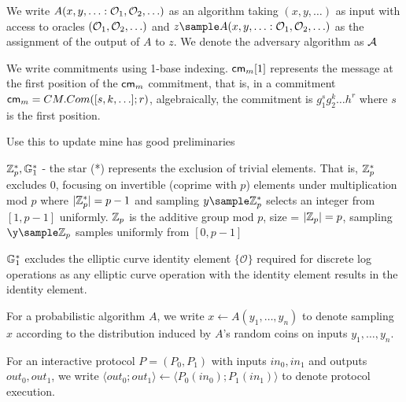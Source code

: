 We write $A(x,y,\ldots : \mathcal{O}_1, \mathcal{O}_2, \ldots)$ as an algorithm taking $(x,y,\ldots)$ as input with access to oracles $(\mathcal{O}_1, \mathcal{O}_2, \ldots)$ and $z \sample A(x,y,\ldots : \oracle_1, \oracle_2, \ldots)$ as the assignment of the output of $A$ to $z$. We denote the adversary algorithm as $\mathcal{A}$

We write commitments using 1-base indexing. $\mathsf{cm}_m[1]$ represents the message at the first position of the $\mathsf{cm}_m$ commitment, that is, in a commitment $\mathsf{cm}_m = CM.Com([s,k,\ldots];r)$, algebraically, the commitment is $g_1^sg_2^k\ldots h^r$ where $s$ is the first position.


Use this to update mine
\cite{hutchison_get_2010} has good preliminaries

$\mathbb{Z}_p^*, \mathbb{G}_1^*$ - the star (*) represents the exclusion of trivial elements. That is, $\mathbb{Z}_p^*$ excludes 0, focusing on invertible (coprime with $p$) elements under multiplication mod $p$ where $|\mathbb{Z}_p^*| = p-1$ and sampling $y \sample \Z_p^*$ selects an integer from $[1, p-1]$ uniformly. $\mathbb{Z}_p$ is the additive group mod $p$, size = $|\mathbb{Z}_p| = p$, sampling $\y \sample \Z_p$ samples uniformly from $[0, p-1]$

$\mathbb{G}_1^*$ excludes the elliptic curve identity element $\{\mathcal{O}\}$ required for discrete log operations as any elliptic curve operation with the identity element results in the identity element. 

For a probabilistic algorithm $A$, we write $x \leftarrow A(y_1,\ldots,y_n)$ to denote sampling $x$ according to the distribution induced by $A$'s random coins on inputs $y_1,\ldots,y_n$. 

For an interactive protocol $P = (P_0, P_1)$ with inputs $in_0, in_1$ and outputs $out_0, out_1$, we write $\langle out_0; out_1 \rangle \leftarrow \langle P_0(in_0); P_1(in_1) \rangle$ to denote protocol execution.

